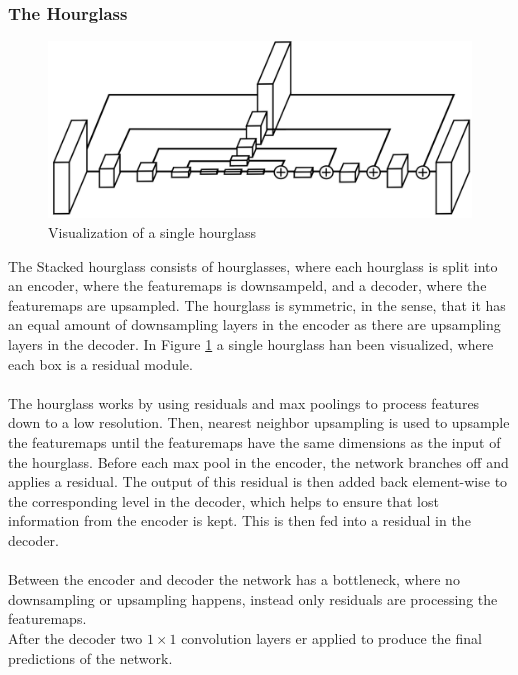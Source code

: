 \documentclass[./main.tex]{subfiles}
\begin{document}
\subsubsection{The Hourglass}
\begin{figure}[h]
    \centering
    \includegraphics[height = 4 cm]{entities/Hourglass.png}
    \caption{Visualization of a single hourglass \cite{Newell}}
    \label{fig:hourglass}
\end{figure}
\noindent The Stacked hourglass consists of hourglasses, where each hourglass is split into an encoder, where the featuremaps is downsampeld, and a decoder, where the featuremaps are upsampled. The hourglass is symmetric, in the sense, that it has an equal amount of downsampling layers in the encoder as there are upsampling layers in the decoder. In Figure \ref{fig:hourglass} a single hourglass han been visualized, where each box is a residual module.
\\
\\
The hourglass works by using residuals and max poolings to process features down to a low resolution. Then, nearest neighbor upsampling is used to upsample the featuremaps until the featuremaps have the same dimensions as the input of the hourglass. Before each max pool in the encoder, the network branches off and applies a residual. The output of this residual is then added back element-wise to the corresponding level in the decoder, which helps to ensure that lost information from the encoder is kept. This is then fed into a residual in the decoder.
\\
\\
Between the encoder and decoder the network has a bottleneck, where no downsampling or upsampling happens, instead only residuals are processing the featuremaps. \\
After the decoder two $1 \times 1$ convolution layers er applied to produce the final predictions of the network.
\end{document}
